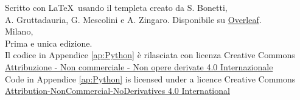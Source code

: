 \documentclass{Configuration_Files/PoliMi3i_thesis}
\begin{document}


\pagestyle{empty} %
\frontmatter %



\newpage
\thispagestyle{empty}
\begin{minipage}{0.6\textwidth}
    \vspace{17cm}
    \scriptsize Scritto con \LaTeX\ usando il templeta creato da S. Bonetti, \\ A. Gruttadauria, G. Mescolini e A. Zingaro. Disponibile su \href{https://www.overleaf.com/latex/templates/classical-format-thesis-scuola-di-ingegneria-industriale-e-dellinformazione-politecnico-di-milano/dkmvtndqkyxg}{Overleaf}. \\[4ex]
    Milano,  \\ Prima e unica edizione. \\[4ex] 
    Il codice in Appendice \ref{ap:Python} è rilasciata con licenza Creative Commons\\ \href{https://creativecommons.org/licenses/by-nc-nd/4.0/deed.it}{Attribuzione - Non commerciale - Non opere derivate 4.0 Internazionale}\\[3ex] 
    Code in Appendice \ref{ap:Python} is licensed under a licence Creative Commons\\ \href{https://creativecommons.org/licenses/by-nc-nd/4.0/deed.en}{Attribution-NonCommercial-NoDerivatives 4.0 International}
\end{minipage}
\end{document}
